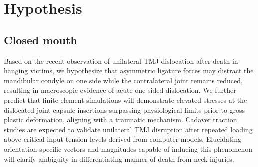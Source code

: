 \documentclass{article}
\begin{document}



\section{Hypothesis}

\subsection{Closed mouth}
Based on the recent observation of unilateral TMJ dislocation after death in hanging victims, we hypothesize that asymmetric ligature forces may distract the mandibular condyle on one side while the contralateral joint remains reduced, resulting in macroscopic evidence of acute one-sided dislocation. 
We further predict that finite element simulations will demonstrate elevated stresses at the dislocated joint capsule insertions surpassing physiological limits prior to gross plastic deformation, aligning with a traumatic mechanism. 
Cadaver traction studies are expected to validate unilateral TMJ disruption after repeated loading above critical input tension levels derived from computer models. 
Elucidating orientation-specific vectors and magnitudes capable of inducing this phenomenon will clarify ambiguity in differentiating manner of death from neck injuries.
\end{document}
